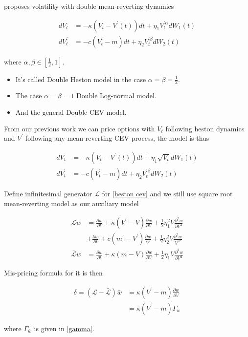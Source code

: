\cite{gatheral_consistent_nodate} proposes volatility with double mean-reverting dynamics

$$
    \begin{aligned}
        d V_t &=-\kappa\left(V_t-V^{\prime}(t)\right) d t+\eta_{1} V^{\prime \alpha}_t  d W_1(t) \\
        d V^{\prime}_t &=-c\left(V^{\prime}_t-m\right) d t+\eta_{2} V^{\prime \beta}_t d W_{2}(t)
    \end{aligned}
$$

\noindent where $\alpha, \beta \in [\frac{1}{2},1]$.

\begin{itemize}
    \item It's called Double Heston model in the case $\alpha=\beta=\frac{1}{2}$.
    \item The case $\alpha=\beta=1$ Double Log-normal model.
    \item And the general Double CEV model.
\end{itemize}

From our previous work we can price options with $V_t$ following heston dynamics and $V^{\prime}$ following any mean-reverting CEV process, the model is thus

\begin{equation}\label{heston cev}
    \begin{aligned}
        d V_t &=-\kappa\left(V_t-V^{\prime}(t)\right) d t+\eta_{1} \sqrt{V_t} d W_1(t) \\
        d V^{\prime}_t &=-c\left(V^{\prime}_t-m\right) d t+\eta_{2} V^{\prime \beta}_t d W_{2}(t)
    \end{aligned}
\end{equation}

Define infinitesimal generator $\mathcal{L}$ for \eqref{heston cev} and we still use square root mean-reverting model as our auxiliary model

\begin{equation}\label{inf gen2}
    \begin{aligned}
        \mathcal{L} w&= \frac{\partial w}{\partial t}+\kappa(V^{\prime} - V) \frac{\partial w}{\partial V}+\frac{1}{2} \eta_1^{2} V \frac{\partial^{2} w}{\partial V^{2}} \\
        &+ \frac{\partial w}{\partial t}+c(m^{\prime} - V^{\prime}) \frac{\partial w}{V^{\prime}}+\frac{1}{2} \eta_2^{2} V \frac{\partial^{2} w}{V^{\prime 2}}\\
        \bar{\mathcal{L}} w &= \frac{\partial w}{\partial t}+\kappa(m - V) \frac{\partial w}{\partial V}+\frac{1}{2} \eta_1 V \frac{\partial^{2} w}{\partial V^{2}}
    \end{aligned}
\end{equation}

\noindent Mis-pricing formula for it is then

$$
\begin{aligned}
    \delta = (\mathcal{L} - \bar{\mathcal{L}}) \bar{w} &= \kappa(V^{\prime}-m)\frac{\partial w}{\partial V} \\
    &= \kappa(V^{\prime}-m) \Gamma_{\bar{w}}
\end{aligned}
$$

\noindent where $\Gamma_{\bar{w}}$ is given in \eqref{gamma}.